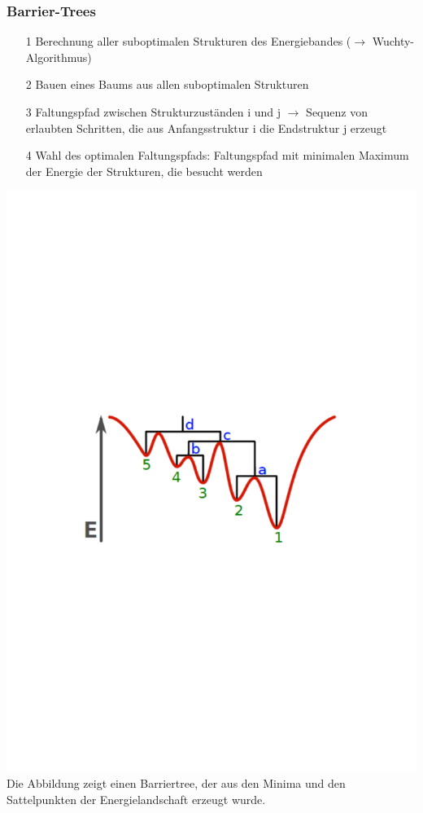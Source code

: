 \subsubsection{Barrier-Trees}
\begin{itemize}
\item[1] Berechnung aller suboptimalen Strukturen des Energiebandes ($\rightarrow$ Wuchty-Algorithmus) 
\item[2] Bauen eines Baums aus allen suboptimalen Strukturen
\item[3] Faltungspfad zwischen Strukturzuständen i und j $\rightarrow$ Sequenz von erlaubten Schritten, die aus Anfangsstruktur i die Endstruktur j erzeugt
\item[4] Wahl des optimalen Faltungspfads: Faltungspfad mit minimalen Maximum der Energie der Strukturen, die besucht werden
\end{itemize}
\includegraphics[scale=0.7]{lectures/160523/pix/Barrier-Tree.pdf} \\
Die Abbildung zeigt einen Barriertree, der aus den Minima und den Sattelpunkten der Energielandschaft erzeugt wurde. 

